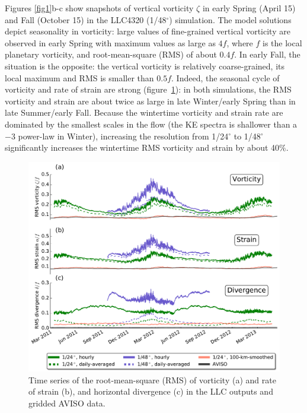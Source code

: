 \documentclass[grl]{agutex2015}
\begin{document}
\begin{article}
Figures \ref{fig1}b-c show snapshots of vertical vorticity $\zeta$ in early Spring
(April 15) and Fall (October 15) in the LLC4320 (1/48$^\circ$) simulation.
The model solutions depict seasonality in vorticity: large values of
fine-grained vertical vorticity are observed in early Spring with maximum
values as large as $4f$, where $f$ is
the local planetary vorticity, and root-mean-square (RMS) of about $0.4f$. In early
Fall, the situation is the opposite: the vertical vorticity is relatively coarse-grained,
its local maximum and RMS is smaller than $0.5f$.
Indeed, the seasonal cycle of vorticity and rate of strain are strong (figure~\ref{fig2}):
in both simulations, the RMS vorticity and strain are about twice as large in
late Winter/early Spring
than in late Summer/early Fall. Because the wintertime vorticity and strain rate
are dominated by the smallest scales in the flow (the KE spectra is shallower than
a $-3$ power-law in Winter), increasing the resolution from
1/24$^\circ$ to 1/48$^\circ$ significantly increases the wintertime RMS vorticity
and strain by about 40$\%$.

 \begin{figure}[ht]
   \begin{center}
     \includegraphics[width=.75\textwidth]{figs/fig2.pdf}
  \caption{Time series of the root-mean-square (RMS) of vorticity (a) and
  rate of strain (b), and horizontal divergence (c) in the LLC outputs and gridded AVISO data.}
  \label{fig2}
  \end{center}
\end{figure}


\end{article}
\end{document}
